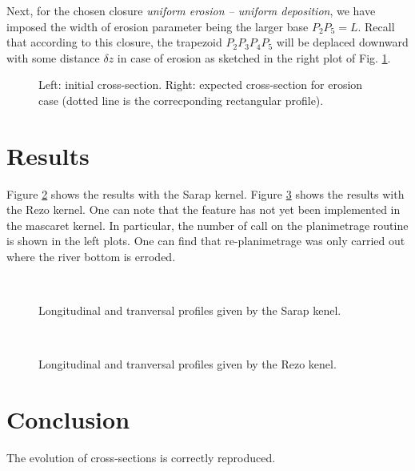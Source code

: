 Next, for the chosen closure {\em uniform erosion -- uniform deposition}, we have imposed the width of erosion parameter being the larger base $P_2P_5 = L$. Recall that according to this closure, the trapezoid $P_2P_3P_4P_5$ will be deplaced downward with some distance $\delta z$ in case of erosion as sketched in the right plot of Fig. \ref{newton_trapeze:fig:profile_init}.
\begin{figure}[!ht]
  \centering
  \begin{minipage}{0.49\textwidth}
  \end{minipage}
  \begin{minipage}{0.49\textwidth}
  \end{minipage}
 \caption{Left: initial cross-section. Right: expected cross-section for erosion case (dotted line is the correcponding rectangular profile).}
 \label{newton_trapeze:fig:profile_init}
\end{figure}

\section{Results}

Figure \ref{newton_trapeze:fig:sarap} shows the results with the Sarap kernel.
Figure \ref{newton_trapeze:fig:rezo} shows the results with the Rezo kernel.
One can note that the feature has not yet been implemented in the mascaret kernel.
In particular,
the number of call on the planimetrage routine is shown in the left plots. One can
find that re-planimetrage was only carried out where the river bottom is erroded.
\begin{figure}[!ht]
 \centering
 \\
 \caption{Longitudinal and tranversal profiles given by the Sarap kenel.}
 \label{newton_trapeze:fig:sarap}
\end{figure}

\begin{figure}[!ht]
 \centering
 \\
 \caption{Longitudinal and tranversal profiles given by the Rezo kenel.}
 \label{newton_trapeze:fig:rezo}
\end{figure}

\section{Conclusion}
The evolution of cross-sections is correctly reproduced.
